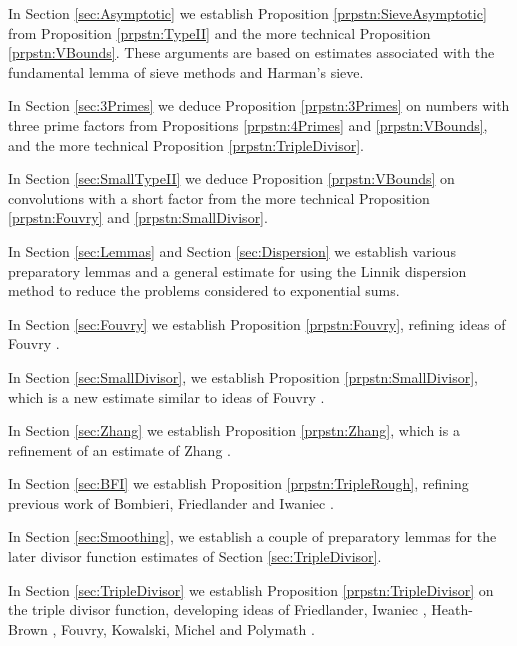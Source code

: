 \documentclass[10pt]{amsart}
\theoremstyle{plain}
\numberwithin{equation}{section}
\begin{document}
In Section \ref{sec:Asymptotic} we establish Proposition %
\ref{prpstn:SieveAsymptotic} from Proposition \ref{prpstn:TypeII} and the more technical Proposition \ref{prpstn:VBounds}. These arguments are based on estimates associated with the fundamental lemma of sieve methods and Harman's sieve.

In Section \ref{sec:3Primes} we deduce Proposition \ref{prpstn:3Primes} on numbers with three prime factors from Propositions \ref{prpstn:4Primes} and \ref{prpstn:VBounds}, and the more technical Proposition \ref{prpstn:TripleDivisor}.

In Section \ref{sec:SmallTypeII} we deduce Proposition \ref{prpstn:VBounds} on convolutions with a short factor from the more technical Proposition \ref{prpstn:Fouvry} and \ref{prpstn:SmallDivisor}.

In Section \ref{sec:Lemmas} and Section \ref{sec:Dispersion} we establish various preparatory lemmas and a general estimate for using the Linnik dispersion method to reduce the problems considered  to exponential sums.

In Section \ref{sec:Fouvry} we establish Proposition \ref{prpstn:Fouvry}, refining ideas of Fouvry \cite{Fouvry}.

In Section \ref{sec:SmallDivisor}, we establish Proposition \ref{prpstn:SmallDivisor}, which is a new estimate similar to ideas of Fouvry \cite{Fouvry}.

In Section \ref{sec:Zhang} we establish Proposition \ref{prpstn:Zhang}, which is a refinement of an estimate of Zhang \cite{Zhang}.

In Section \ref{sec:BFI} we establish Proposition \ref{prpstn:TripleRough}, refining previous work of Bombieri, Friedlander and Iwaniec \cite[Theorem 4]{BFI2}.

In Section \ref{sec:Smoothing}, we establish a couple of preparatory lemmas for the later divisor function estimates of Section \ref{sec:TripleDivisor}.

In Section \ref{sec:TripleDivisor} we establish Proposition \ref{prpstn:TripleDivisor} on the triple divisor function, developing ideas of Friedlander, Iwaniec \cite{FIDivisor}, Heath-Brown \cite{HBDivisor}, Fouvry, Kowalski, Michel \cite{FKMDivisor} and Polymath \cite{Polymath}.
%
%
%
%
%
%
%
%
%
%
%
%
%
%
%
%
%
%
%
%
\end{document}
